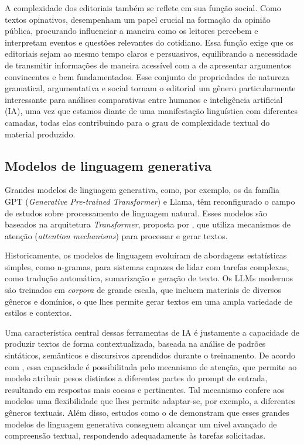 \documentclass[portuguese]{textolivre}
\begin{document}
A complexidade dos editoriais também se reflete em sua função social.
Como textos opinativos, desempenham um papel crucial na formação da opinião pública, procurando influenciar a maneira como os leitores percebem e interpretam eventos e questões relevantes do cotidiano.
Essa função exige que os editoriais sejam ao mesmo tempo claros e persuasivos, equilibrando a necessidade de transmitir informações de maneira acessível com a de apresentar argumentos convincentes e bem fundamentados.
Esse conjunto de propriedades de natureza gramatical, argumentativa e social tornam o editorial um gênero particularmente interessante para análises comparativas entre humanos e inteligência artificial (IA), uma vez que estamos diante de uma manifestação linguística com diferentes camadas, todas elas contribuindo para o grau de complexidade textual do material produzido.

\subsection{Modelos de linguagem generativa}\label{sec-modelos}
Grandes modelos de linguagem generativa, como, por exemplo, os da família GPT (\emph{Generative Pre-trained Transformer}) e Llama, têm reconfigurado o campo de estudos sobre processamento de linguagem natural.
Esses modelos são baseados na arquitetura \emph{Transformer}, proposta por \textcite{Vaswani2018}, que utiliza mecanismos de atenção (\emph{attention mechanisms}) para processar e gerar textos.

Historicamente, os modelos de linguagem evoluíram de abordagens estatísticas simples, como n-gramas, para sistemas capazes de lidar com tarefas complexas, como tradução automática, sumarização e geração de texto.
Os LLMs modernos são treinados em \emph{corpora} de grande escala, que incluem materiais de diversos gêneros e domínios, o que lhes permite gerar textos em uma ampla variedade de estilos e contextos.

Uma característica central dessas ferramentas de IA é justamente a capacidade de produzir textos de forma contextualizada, baseada na análise de padrões sintáticos, semânticos e discursivos aprendidos durante o treinamento.
De acordo com \textcite{Radford2019}, essa capacidade é possibilitada pelo mecanismo de atenção, que permite ao modelo atribuir pesos distintos a diferentes partes do prompt de entrada, resultando em respostas mais coesas e pertinentes.
Tal mecanismo confere aos modelos uma flexibilidade que lhes permite adaptar-se, por exemplo, a diferentes gêneros textuais.
Além disso, estudos como o de \textcite{Touvron2023} demonstram que esses grandes modelos de linguagem generativa conseguem alcançar um nível avançado de compreensão textual, respondendo adequadamente às tarefas solicitadas.
 
\end{document}
